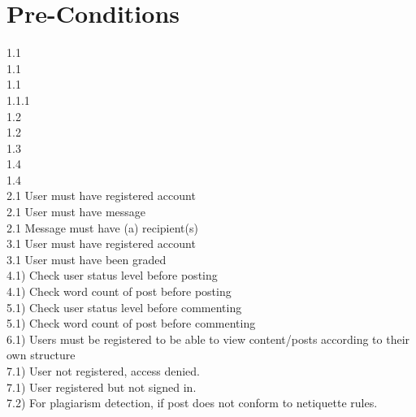 \documentclass{scrreprt}
\begin{document}
\section{Pre-Conditions}								%
1.1\\
1.1\\
1.1\\
1.1.1\\
1.2\\
1.2\\
1.3\\
1.4\\
1.4\\
2.1 User must have registered account\\
2.1 User must have message\\
2.1 Message must have (a) recipient(s)\\
3.1 User must have registered account\\
3.1 User must have been graded\\
4.1) Check user status level before posting\\
4.1) Check word count of post before posting\\
5.1) Check user status level before commenting\\
5.1) Check word count of post before commenting\\
6.1) Users must be registered to be able to view content/posts according to their own structure\\
7.1) User not registered, access denied.\\
7.1) User registered but not signed in.\\
7.2) For plagiarism detection, if post does not conform to netiquette rules.\\
\end{document}

